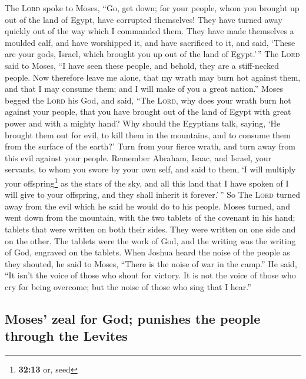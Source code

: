  The \textsc{Lord} spoke to Moses, ``Go, get down; for
your people, whom you brought up out of the land of Egypt, have
corrupted themselves!  They have turned away quickly out
of the way which I commanded them. They have made themselves a moulded
calf, and have worshipped it, and have sacrificed to it, and said,
`These are your gods, Israel, which brought you up out of the land of
Egypt.'\,''  The \textsc{Lord} said to Moses, ``I have
seen these people, and behold, they are a stiff-necked people.
 Now therefore leave me alone, that my wrath may burn hot
against them, and that I may consume them; and I will make of you a
great nation.''  Moses begged the \textsc{Lord} his God,
and said, ``The \textsc{Lord}, why does your wrath burn hot against your
people, that you have brought out of the land of Egypt with great power
and with a mighty hand?  Why should the Egyptians talk,
saying, `He brought them out for evil, to kill them in the mountains,
and to consume them from the surface of the earth?' Turn from your
fierce wrath, and turn away from this evil against your people.
 Remember Abraham, Isaac, and Israel, your servants, to
whom you swore by your own self, and said to them, `I will multiply your
offspring\footnote{\textbf{32:13} or, seed} as the stars of the sky, and
all this land that I have spoken of I will give to your offspring, and
they shall inherit it forever.'\,''  So The \textsc{Lord}
turned away from the evil which he said he would do to his people.
 Moses turned, and went down from the mountain, with the
two tablets of the covenant in his hand; tablets that were written on
both their sides. They were written on one side and on the other.
 The tablets were the work of God, and the writing was
the writing of God, engraved on the tablets.  When Joshua
heard the noise of the people as they shouted, he said to Moses, ``There
is the noise of war in the camp.''  He said, ``It isn't
the voice of those who shout for victory. It is not the voice of those
who cry for being overcome; but the noise of those who sing that I
hear.''

\hypertarget{moses-zeal-for-god-punishes-the-people-through-the-levites}{%
\subsection{Moses' zeal for God; punishes the people through the
Levites}\label{moses-zeal-for-god-punishes-the-people-through-the-levites}}

